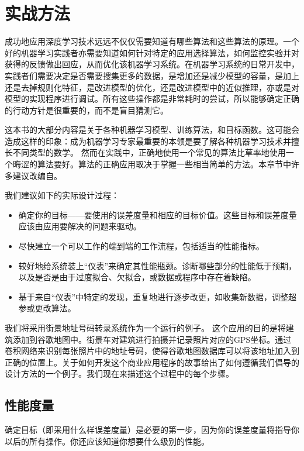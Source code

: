 ﻿%
\chapter{实战方法}
\label{chap:11}

成功地应用深度学习技术远远不仅仅需要知道有哪些算法和这些算法的原理。一个好的机器学习实践者亦需要知道如何针对特定的应用选择算法，如何监控实验并对获得的反馈做出回应，从而优化该机器学习系统。在机器学习系统的日常开发中，实践者们需要决定是否需要搜集更多的数据，是增加还是减少模型的容量，是加上还是去掉规则化特征，是改进模型的优化，还是改进模型中的近似推理，亦或是对模型的实现程序进行调试。所有这些操作都是非常耗时的尝试，所以能够确定正确的行动方针是很重要的，而不是盲目猜测它。

这本书的大部分内容是关于各种机器学习模型、训练算法，和目标函数。这可能会造成这样的印象：成为机器学习专家最重要的本领是要了解各种机器学习技术并擅长不同类型的数学。 然而在实践中，正确地使用一个常见的算法比草率地使用一个晦涩的算法要好。算法的正确应用取决于掌握一些相当简单的方法。本章节中许多建议改编自。

我们建议如下的实际设计过程：
\begin{itemize}
\item 确定你的目标——要使用的误差度量和相应的目标价值。这些目标和误差度量应该由应用要解决的问题来驱动。
\item 尽快建立一个可以工作的端到端的工作流程，包括适当的性能指标。
\item 较好地给系统装上“仪表”来确定其性能瓶颈。诊断哪些部分的性能低于预期，以及是否是由于过度拟合、欠拟合，或数据或程序中存在着缺陷。
\item 基于来自“仪表”中特定的发现，重复地进行逐步改更，如收集新数据，调整超参或更改算法。
\end{itemize}

我们将采用街景地址号码转录系统作为一个运行的例子。 这个应用的目的是将建筑添加到谷歌地图中。街景车对建筑进行拍摄并记录照片对应的GPS坐标。通过卷积网络来识别每张照片中的地址号码，使得谷歌地图数据库可以将该地址加入到正确的位置上。关于如何开发这个商业应用程序的故事给出了如何遵循我们倡导的设计方法的一个例子。我们现在来描述这个过程中的每个步骤。

\section{性能度量}
\label{sec:11.1}
确定目标（即采用什么样误差度量）是必要的第一步，因为你的误差度量将指导你以后的所有操作。你还应该知道你想要什么级别的性能。

